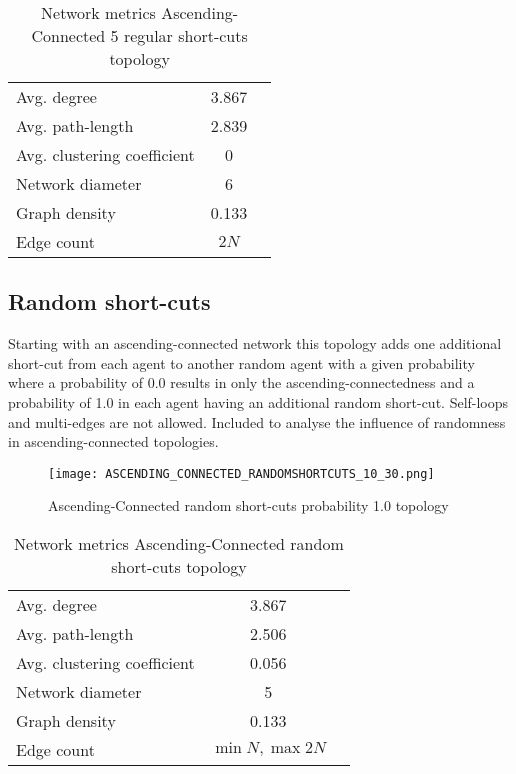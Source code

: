 \documentclass[Bachelorarbeit.tex]{subfiles}
\begin{document}
\begin{table}[h]
	\centering
	\caption{Network metrics Ascending-Connected 5 regular short-cuts topology}
	\begin{tabular} { l c r }
		\hline
		Avg. degree & 3.867 \\
		Avg. path-length & 2.839 \\
		Avg. clustering coefficient & 0 \\
		Network diameter & 6 \\
		Graph density & 0.133\\
		Edge count & $2N$ \\
		\hline
	\end{tabular}
\end{table}

\subsection{Random short-cuts}
Starting with an ascending-connected network this topology adds one additional short-cut from each agent to another random agent with a given probability where a probability of 0.0 results in only the ascending-connectedness and a probability of 1.0 in each agent having an additional random short-cut. Self-loops and multi-edges are not allowed.
\medskip
Included to analyse the influence of randomness in ascending-connected topologies.

\begin{figure}[H]
	\centering
  \texttt{[image: ASCENDING\_CONNECTED\_RANDOMSHORTCUTS\_10\_30.png]}
	\caption{Ascending-Connected random short-cuts probability 1.0 topology}
	\label{fig:topology_ASCENDING_CONNECTED_RANDOMSHORTCUTS_10_30}
\end{figure}

\begin{table}[h]
	\centering
	\caption{Network metrics Ascending-Connected random short-cuts topology}
	\begin{tabular} { l c r }
		\hline
		Avg. degree & 3.867 \\
		Avg. path-length & 2.506 \\
		Avg. clustering coefficient & 0.056 \\
		Network diameter & 5 \\
		Graph density & 0.133\\
		Edge count & $\min N, \max 2N$ \\
		\hline
	\end{tabular}
\end{table}
\end{document}
